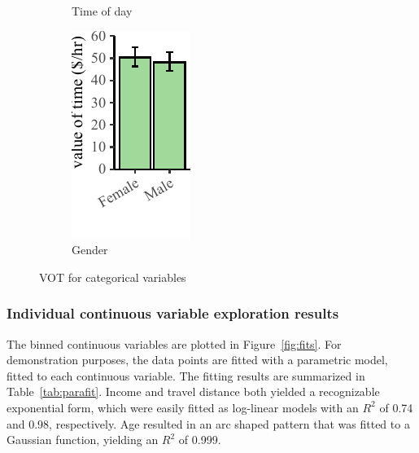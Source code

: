 \documentclass[numbered]{trbunofficial}\usepackage[]{graphicx}\usepackage[]{color}
\makeatletter
\def\maxwidth{ %
  \ifdim\Gin@nat@width>\linewidth
    \linewidth
  \else
    \Gin@nat@width
  \fi
}
\newenvironment{knitrout}{}{} %
\makeatother
\begin{document}
\begin{figure}[!h]
\begin{subfigure}[t]{0.26\textwidth}
\begin{knitrout}
\end{knitrout}
    \caption{\centering Time of day}
	  \label{fig:vottod}
  \end{subfigure}
  \begin{subfigure}[t]{0.15\textwidth}
\begin{knitrout}
\color{fgcolor}
\includegraphics[width=\maxwidth]{figure/plot_votgend-1} 

\end{knitrout}
	\caption{\centering Gender}
	\label{fig:votgend}
	\end{subfigure}
	\caption{VOT for categorical variables}
	\label{fig:votcats}
\end{figure}

\subsubsection{Individual continuous variable exploration results}

The binned continuous variables are plotted in Figure~\ref{fig:fits}. For demonstration purposes, the data points are fitted with a parametric model, fitted to each continuous variable. The fitting results are summarized in Table~\ref{tab:parafit}. Income and travel distance both yielded a recognizable exponential form, which were easily fitted as log-linear models with an $R^2$ of 0.74 and 0.98, respectively. Age resulted in an arc shaped pattern that was fitted to a Gaussian function, yielding an $R^2$ of 0.999. 
\end{document}
